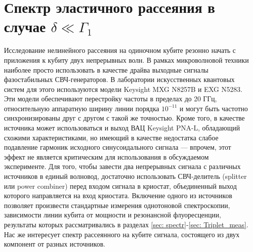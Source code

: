 \section{Спектр эластичного рассеяния в случае $\delta \ll \Gamma_1$}
Исследование нелинейного рассеяния на одиночном кубите резонно начать с приложения к кубиту двух непрерывных волн. В рамках микроволновой техники наиболее просто использовать в качестве драйва выходные сигналы фазостабильных СВЧ-генераторов. В лаборатории искусственных квантовых систем для этого используются модели Keysight MXG N8257B и EXG N5283. Эти модели обеспечивают перестройку частоты в пределах до 20 ГГц, относительную аппаратную ширину линии порядка $10^{-11}$ и могут быть частотно синхронизированы друг с другом с такой же точностью. Кроме того, в качестве источника может использоваться и выход ВАЦ Keysight PNA-L, обладающий схожими характеристиками, но имеющий в качестве недостатка слабое подавление гармоник исходного синусоидального сигнала --- впрочем, этот эффект не является критическим для использования в обсуждаемом эксперименте. Для того, чтобы завести два непрерывных сигнала с различных источников в единый волновод, достаточно использовать СВЧ-делитель (splitter или power combiner) перед входом сигнала в криостат, объединенный выход которого направляется на вход криостата. Включение одного из источников позволяет произвести стандартные измерения однотоновой спектроскопии, зависимости линии кубита от мощности и резонансной флуоресценции, результаты которых рассматривались в разделах \ref{sec: spectr}-\ref{sec: Triplet_meas}. Нас же интересует спектр рассеянного на кубите сигнала, состоящего из двух компонент от разных источников.

